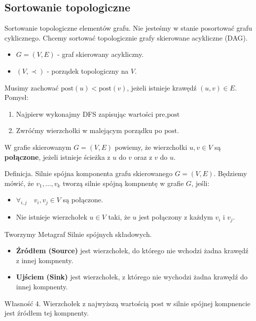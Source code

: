 \documentclass{article}
\numberwithin{equation}{subsection}
\begin{document}
\subsection{Sortowanie topologiczne}

Sortowanie topologiczne elementów grafu. Nie jesteśmy w stanie posortować grafu cyklicznego.
Chcemy sortować topologicznie grafy skierowane acykliczne (DAG).

\begin{itemize}
    \item $G=(V,E)$ - graf skierowany acykliczny.
    \item $(V,\prec)$ - porządek topologiczny na $V$.
\end{itemize}
Musimy zachować $\text{post}(u) < \text{post}(v)$, jeżeli istnieje krawędź $(u,v)\in E$.
Pomysł:
\begin{enumerate}
    \item Najpierw wykonajmy DFS zapisując wartości $\text{pre},\text{post}$
    \item Zwróćmy wierzchołki w malejącym porządku po $\text{post}$.
\end{enumerate}

\noindent
W grafie skierowanym $G=(V,E)$ powiemy, że wierzchołki $u,v\in V$ są \textbf{połączone}, jeżeli istnieje ścieżka z $u$ do $v$ oraz z $v$ do $u$.

\noindent
Definicja. Silnie spójna komponenta grafu skierowanego $G=(V,E)$.
Będziemy mówić, że $v_1, \dots, v_k$ tworzą silnie spójną kompnentę w grafie $G$, jeśli:
\begin{itemize}
    \item $\forall_{i,j} \quad v_i, v_j \in V$ są połączone.
    \item Nie istnieje wierzchołek $u\in V$ taki, że $u$ jest połączony z każdym $v_i$ i $v_j$.
\end{itemize}

\noindent
Tworzymy Metagraf Silnie spójnych składowych.
\begin{itemize}
    \item \textbf{Źródłem (Source)} jest wierzchołek, do którego nie wchodzi żadna krawędź z innej kompnenty.
    \item \textbf{Ujściem (Sink)} jest wierzchołek, z którego nie wychodzi żadna krawędź do innej kompnenty.
\end{itemize}

\noindent
Własność 4. Wierzchołek z najwyższą wartością $\text{post}$ w silnie spójnej kompnencie jest źródłem tej kompnenty.\\
\end{document}
